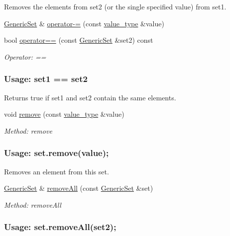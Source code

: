 \begin{DoxyCompactItemize}
\begin{DoxyCompactList}
Removes the elements from {\ttfamily set2} (or the single specified value) from {\ttfamily set1}. \end{DoxyCompactList}\item 
\mbox{\hyperlink{classstanfordcpplib_1_1collections_1_1GenericSet}{Generic\+Set}} \& \mbox{\hyperlink{classstanfordcpplib_1_1collections_1_1GenericSet_a6c4b3d414008341cbea6e24f14a2ee11}{operator-\/=}} (const \mbox{\hyperlink{classstanfordcpplib_1_1collections_1_1GenericSet_a669c81f158766925e7293f97c0099b28}{value\+\_\+type}} \&value)
\item 
bool \mbox{\hyperlink{classstanfordcpplib_1_1collections_1_1GenericSet_a7f956a22921c1683b74783b055bbb2b5}{operator==}} (const \mbox{\hyperlink{classstanfordcpplib_1_1collections_1_1GenericSet}{Generic\+Set}} \&set2) const
\begin{DoxyCompactList}\small\item\em Operator\+: == \subsubsection*{Usage\+: set1 == set2 }

Returns {\ttfamily true} if {\ttfamily set1} and {\ttfamily set2} contain the same elements. \end{DoxyCompactList}\item 
void \mbox{\hyperlink{classstanfordcpplib_1_1collections_1_1GenericSet_ab522af639e5f45b032943bc611de79db}{remove}} (const \mbox{\hyperlink{classstanfordcpplib_1_1collections_1_1GenericSet_a669c81f158766925e7293f97c0099b28}{value\+\_\+type}} \&value)
\begin{DoxyCompactList}\small\item\em Method\+: remove \subsubsection*{Usage\+: set.\+remove(value); }

Removes an element from this set. \end{DoxyCompactList}\item 
\mbox{\hyperlink{classstanfordcpplib_1_1collections_1_1GenericSet}{Generic\+Set}} \& \mbox{\hyperlink{classstanfordcpplib_1_1collections_1_1GenericSet_a59fc29f868cd2ce2668788198e8a05a7}{remove\+All}} (const \mbox{\hyperlink{classstanfordcpplib_1_1collections_1_1GenericSet}{Generic\+Set}} \&set)
\begin{DoxyCompactList}\small\item\em Method\+: remove\+All \subsubsection*{Usage\+: set.\+remove\+All(set2); }


\end{DoxyCompactList}
\end{DoxyCompactItemize}
